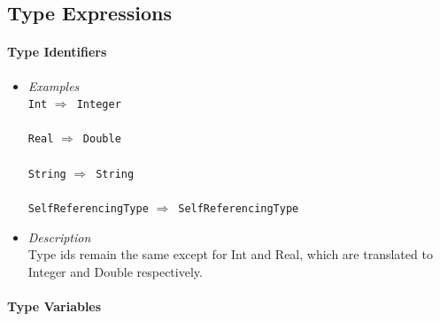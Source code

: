 \documentclass[diploma]{softlab-thesis}
\def\lra{$\Longrightarrow$\ }
\begin{document}
\subsection{Type Expressions}

\paragraph{Type Identifiers}


\begin{itemize}
\item
\textit{Examples}\\

\verb|Int| \lra \verb|Integer|\\\\
\verb|Real| \lra \verb|Double|\\\\
\verb|String| \lra \verb|String|\\\\
\verb|SelfReferencingType| \lra \verb|SelfReferencingType|\\
\item
\textit{Description}\\

Type ids remain the same except for Int and Real, which are translated to
Integer and Double respectively.

\end{itemize}

\paragraph{Type Variables}
\end{document}
